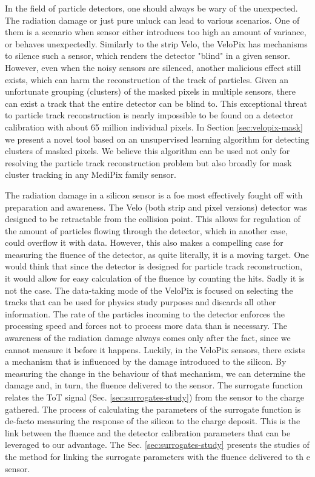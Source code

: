 In the field of particle detectors, one should always be wary of the unexpected. 
The radiation damage or just pure unluck can lead to various scenarios. One of them is a scenario when sensor either introduces too high an amount of variance, or behaves unexpectedly.
Similarly to the strip Velo, the VeloPix has mechanisms to silence such a sensor, which renders the detector "blind" in a given sensor.
However, even when the noisy sensors are silenced, another malicious effect still exists, which can harm the reconstruction of the track of particles.
Given an unfortunate grouping (clusters) of the masked pixels in multiple sensors, there can exist a track that the entire detector can be blind to.
This exceptional threat to particle track reconstruction is nearly impossible to be found on a detector calibration with about 65 million individual pixels.
In Section \ref{sec:velopix-mask} we present a novel tool based on an unsupervised learning algorithm for detecting clusters of masked pixels.
We believe this algorithm can be used not only for resolving the particle track reconstruction problem but also broadly for mask cluster tracking in any MediPix family sensor.


The radiation damage in a silicon sensor is a foe most effectively fought off with preparation and awareness.
The Velo (both strip and pixel versions) detector was designed to be retractable from the collision point. 
This allows for regulation of the amount of particles flowing through the detector, which in another case, could overflow it with data.
However, this also makes a compelling case for measuring the fluence of the detector, as quite literally, it is a moving target.
One would think that since the detector is designed for particle track reconstruction, it would allow for easy calculation of the fluence by counting the hits.
Sadly it is not the case.
The data-taking mode of the VeloPix is focused on selecting the tracks that can be used for physics study purposes and discards all other information.
The rate of the particles incoming to the detector enforces the processing speed and forces not to process more data than is necessary.
The awareness of the radiation damage always comes only after the fact, since we cannot measure it before it happens.
Luckily, in the VeloPix sensors, there exists a mechanism that is influenced by the damage introduced to the silicon.
By measuring the change in the behaviour of that mechanism, we can determine the damage and, in turn, the fluence delivered to the sensor.
The surrogate function relates the ToT signal (Sec. \ref{sec:surrogates-study}) from the sensor to the charge gathered.
The process of calculating the parameters of the surrogate function is de-facto measuring the response of the silicon to the charge deposit. 
This is the link between the fluence and the detector calibration parameters that can be leveraged to our advantage.
The Sec. \ref{sec:surrogates-study} presents the studies of the method for linking the surrogate parameters with the fluence delivered to th e sensor.


